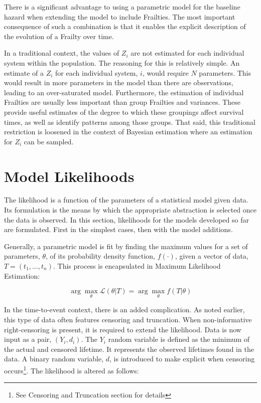 There is a significant advantage to using a parametric model for the baseline hazard when extending the model to include Frailties. The most important consequence of such a combination is that it enables the explicit description of the evolution of a Frailty over time.

In a traditional context, the values of $Z_i$ are not estimated for each individual system within the population. The reasoning for this is relatively simple. An estimate of a $Z_i$ for each individual system, $i$, would require $N$ parameters. This would result in more parameters in the model than there are observations, leading to an over-saturated model. Furthermore, the estimation of individual Frailties are usually less important than group Frailties and variances. These provide useful estimates of the degree to which these groupings affect survival times, as well as identify patterns among those groups. That said, this traditional restriction is loosened in the context of Bayesian estimation where an estimation for $Z_i$ can be sampled.




\section*{Model Likelihoods}

The likelihood is a function of the parameters of a statistical model given data. Its formulation is the means by which the appropriate abstraction is selected once the data is observed. In this section, likelihoods for the models developed so far are formulated. First in the simplest cases, then with the model additions.

Generally, a parametric model is fit by finding the maximum values for a set of parameters, $\theta$, of its probability density function, $f(\cdot)$, given a vector of data, $T = (t_1, \dots, t_n)$. This process is encapsulated in Maximum Likelihood Estimation:

$$ {\displaystyle \arg \max _{\theta }{\mathcal {L}}(\theta | T)=\arg \max _{\theta }f(T|\theta )} $$

In the time-to-event context, there is an added complication. As noted earlier, this type of data often features censoring and truncation. When non-informative right-censoring is present, it is required to extend the likelihood. Data is now input as a pair, $(Y_i, d_i)$. The $Y_i$ random variable is defined as the minimum of the actual and censored lifetime. It represents the observed lifetimes found in the data. A binary random variable, $d$, is introduced to make explicit when censoring occurs\footnote{See Censoring and Truncation section for details}. The likelihood is altered as follows:

